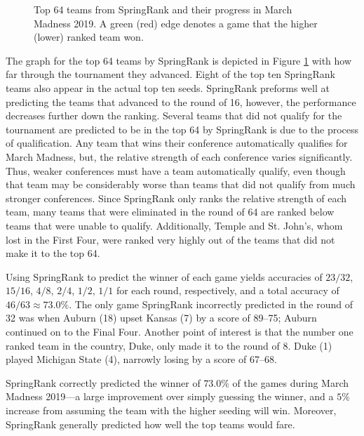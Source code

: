 \documentclass[aps,twocolumn]{revtex4-1}
\begin{document}
\begin{figure}[tbp]
	\caption{Top 64 teams from SpringRank and their progress in March Madness 2019. A green (red) edge denotes a game that the higher (lower) ranked team won.}
	\label{fig:heir}
\end{figure}

The graph for the top 64 teams by SpringRank is depicted in Figure \ref{fig:heir} with how far through the tournament they advanced. Eight of the top ten SpringRank teams also appear in the actual top ten seeds. SpringRank preforms well at predicting the teams that advanced to the round of 16, however, the performance decreases further down the ranking. Several teams that did not qualify for the tournament are predicted to be in the top 64 by SpringRank is due to the process of qualification. Any team that wins their conference automatically qualifies for March Madness, but, the relative strength of each conference varies significantly. Thus, weaker conferences must have a team automatically qualify, even though that team may be considerably worse than teams that did not qualify from much stronger conferences. Since SpringRank only ranks the relative strength of each team, many teams that were eliminated in the round of 64 are ranked below teams that were unable to qualify. Additionally, Temple and St. John's, whom lost in the First Four, were ranked very highly out of the teams that did not make it to the top 64.

Using SpringRank to predict the winner of each game yields accuracies of $23/32$, $15/16$, $4/8$, $2/4$, $1/2$, $1/1$ for each round, respectively, and a total accuracy of $46/63 \approx 73.0\%$. The only game SpringRank incorrectly predicted in the round of 32 was when Auburn (18) upset Kansas (7) by a score of 89--75; Auburn continued on to the Final Four. Another point of interest is that the number one ranked team in the country, Duke, only made it to the round of 8. Duke (1) played Michigan State (4), narrowly losing by a score of 67--68.

SpringRank correctly predicted the winner of $73.0\%$ of the games during March Madness 2019---a large improvement over simply guessing the winner, and a $5\%$ increase from assuming the team with the higher seeding will win. Moreover, SpringRank generally predicted how well the top teams would fare.


\end{document}
